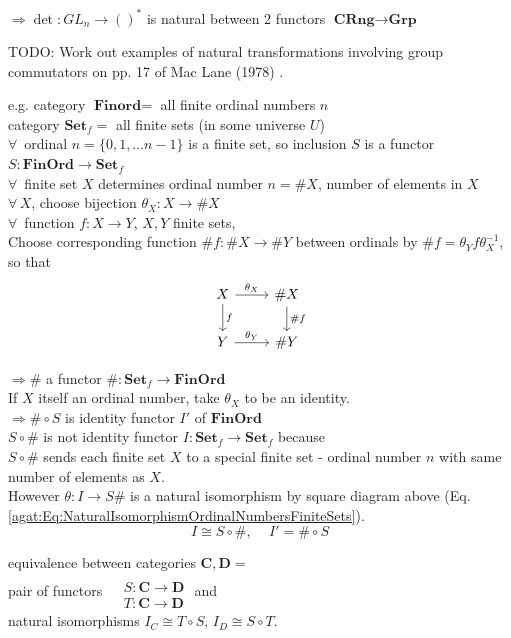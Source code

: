 $\Longrightarrow \det : GL_n \to ()^*$ is natural between 2 functors $\textbf{CRng} \to \textbf{Grp}$

TODO: Work out examples of natural transformations involving group commutators on pp. 17 of Mac Lane (1978) \cite{agat:MacL1978}.

e.g. category $\textbf{Finord} = $ all finite ordinal numbers $n$ \\
category $\textbf{Set}_f = $ all finite sets (in some universe $U$) \\ 
$\forall \, $ ordinal $n = \lbrace 0 , 1 , \dots n-1 \rbrace$ is a finite set, so inclusion $S$ is a functor $S: \textbf{FinOrd} \to \textbf{Set}_f$ \\
$\forall \, $ finite set $X$ determines ordinal number $n = \# X$, number of elements in $X$ \\
$\forall \, X$, choose bijection $\theta_X:X \to \# X$ \\
$\forall \, $ function $f:X \to Y$, $X,Y$ finite sets, \\
Choose corresponding function $\# f : \# X \to \# Y$ between ordinals by $\# f = \theta_Y f \theta_X^{-1}$, so that 
\begin{equation}\label{agat:Eq:NaturalIsomorphismOrdinalNumbersFiniteSets}
\begin{tikzcd}
X \arrow{d}{f} \arrow{r}{\theta_X} & \# X \arrow{d}{\# f} \\
Y \arrow{r}{\theta_Y} & \# Y
\end{tikzcd}
\end{equation}

$\Longrightarrow \# $ a functor $\# : \textbf{Set}_f \to \textbf{FinOrd}$ \\
If $X$ itself an ordinal number, take $\theta_X$ to be an identity. \\
$\Longrightarrow \# \circ S$ is identity functor $I'$ of $\textbf{FinOrd}$ \\
$S \circ \#$ is not identity functor $I : \textbf{Set}_f \to \textbf{Set}_f$ because \\
$S \circ \#$ sends each finite set $X$ to a special finite set - ordinal number $n$ with same number of elements as $X$. \\
However $\theta: I \to S \#$ is a natural isomorphism by square diagram above (Eq. \ref{agat:Eq:NaturalIsomorphismOrdinalNumbersFiniteSets}).  
\[
I \cong S\circ \# , \quad \, I' = \# \circ S 
\]

equivalence between categories $\mathbf{C}, \mathbf{D} =$ \\
pair of functors $\begin{aligned} & \quad \\ 
& S : \mathbf{C} \to \mathbf{D} \\ 
& T : \mathbf{C} \to \mathbf{D} \end{aligned}$ and \\
natural isomorphisms $I_C \cong T \circ S$, $I_D \cong S \circ T$. 





